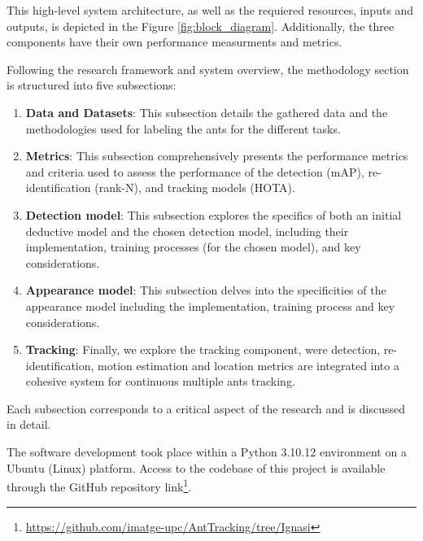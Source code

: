 {
    This high-level system architecture, as well as the requiered resources, inputs and outputs, is depicted in the Figure \ref{fig:block_diagram}. 
    Additionally, the three components have their own performance measurments and metrics.
}

\begin{samepage}

    {
        Following the research framework and system overview, the methodology section is structured into five subsections:
    }
    
    \nopagebreak

    \begin{enumerate}
        \item {
            \textbf{Data and Datasets}: 
            This subsection details the gathered data and the methodologies used for labeling the ants for the different tasks.
        }
        \item {
            \textbf{Metrics}:
            This subsection comprehensively presents the performance metrics and criteria used to assess the performance of the detection (mAP), re-identification (rank-N), and tracking models (HOTA).
        }
        \item {
            \textbf{Detection model}:
            This subsection explores the specifics of both an initial deductive model and the chosen detection model, including their implementation, training processes (for the chosen model), and key considerations.
        }
        \item {
            \textbf{Appearance model}:
            This subsection delves into the specificities of the appearance model including the implementation, training process and key considerations.
        }
        \item {
            \textbf{Tracking}:
            Finally, we explore the tracking component, were detection, re-identification, 
            motion estimation and location metrics are integrated into a cohesive system for continuous multiple ants tracking.
        }
    \end{enumerate}
\end{samepage}

{
    Each subsection corresponds to a critical aspect of the research and is discussed in detail.
}

{
    The software development took place within a Python 3.10.12 environment on a Ubuntu (Linux) platform. 
    Access to the codebase of this project is available through the GitHub repository link\footnote{\url{https://github.com/imatge-upc/AntTracking/tree/Ignasi}}.
}

